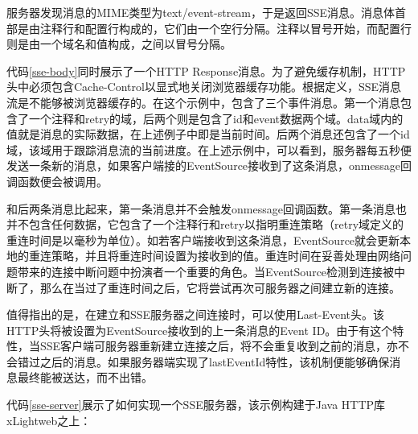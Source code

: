 服务器发现消息的MIME类型为text/event-stream，于是返回SSE消息。消息体首部是由注释行和配置行构成的，它们由一个空行分隔。注释以冒号开始，而配置行则是由一个域名和值构成，之间以冒号分隔。

代码\ref{sse-body}同时展示了一个HTTP Response消息。为了避免缓存机制，HTTP头中必须包含Cache-Control以显式地关闭浏览器缓存功能。根据定义，SSE消息流是不能够被浏览器缓存的。在这个示例中，包含了三个事件消息。第一个消息包含了一个注释和retry的域，后两个则是包含了id和event数据两个域。data域内的值就是消息的实际数据，在上述例子中即是当前时间。后两个消息还包含了一个id域，该域用于跟踪消息流的当前进度。在上述示例中，可以看到，服务器每五秒便发送一条新的消息，如果客户端接的EventSource接收到了这条消息，onmessage回调函数便会被调用。

和后两条消息比起来，第一条消息并不会触发onmessage回调函数。第一条消息也并不包含任何数据，它包含了一个注释行和retry以指明重连策略（retry域定义的重连时间是以毫秒为单位）。如若客户端接收到这条消息，EventSource就会更新本地的重连策略，并且将重连时间设置为接收到的值。重连时间在妥善处理由网络问题带来的连接中断问题中扮演者一个重要的角色。当EventSource检测到连接被中断了，那么在当过了重连时间之后，它将尝试再次可服务器之间建立新的连接。

值得指出的是，在建立和SSE服务器之间连接时，可以使用Last-Event头。该HTTP头将被设置为EventSource接收到的上一条消息的Event ID。由于有这个特性，当SSE客户端可服务器重新建立连接之后，将不会重复收到之前的消息，亦不会错过之后的消息。如果服务器端实现了lastEventId特性，该机制便能够确保消息最终能被送达，而不出错。

代码\ref{sse-server}展示了如何实现一个SSE服务器，该示例构建于Java HTTP库xLightweb之上：

